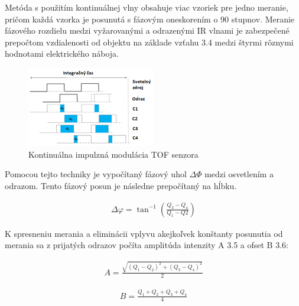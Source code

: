 Metóda s použitím kontinuálnej vlny obsahuje viac vzoriek pre jedno meranie, pričom každá vzorka je posunutá s fázovým oneskorením o 90 stupnov. Meranie fázového rozdielu medzi vyžarovanými a odrazenými IR vlnami je zabezpečené prepočtom vzdialenosti od objektu na základe vzťahu 3.4 medzi štyrmi rôznymi hodnotami elektrického náboja.

\begin{figure}[h]

	\centering

	\includegraphics[width=0.5\textwidth]{figures/tof_principle_b.png} 

	\caption{Kontinuálna impulzná modulácia TOF senzora}
	\label{fig:tof_principle_b}

\end{figure}

Pomocou tejto techniky je vypočítaný fázový uhol $\Delta \varPhi$ medzi osvetlením a odrazom. Tento fázový posun je následne prepočítaný na hĺbku.

\begin{equation}
\label{eq4}
\begin{aligned}
\Delta \varphi=\tan^{-1} \left( \frac{Q_3 - Q_4}{Q_1-Q2} \right) 
\end{aligned}
\end{equation}

K spresneniu merania a eliminácii vplyvu akejkoľvek konštanty posunutia od merania sa z
prijatých odrazov počíta amplitúda intenzity A 3.5 a ofset B 3.6:

\begin{equation}
\label{eq5}
\begin{aligned}
A=\frac{\sqrt{\left(Q_1 - Q_2\right)^2 + \left(Q_3 - Q_4\right)^2 }} {2} 
\end{aligned}
\end{equation}

\begin{equation}
\label{eq6}
\begin{aligned}
B=\frac{Q_1 + Q_2 +Q_3 + Q_4}{4} 
\end{aligned}
\end{equation}

